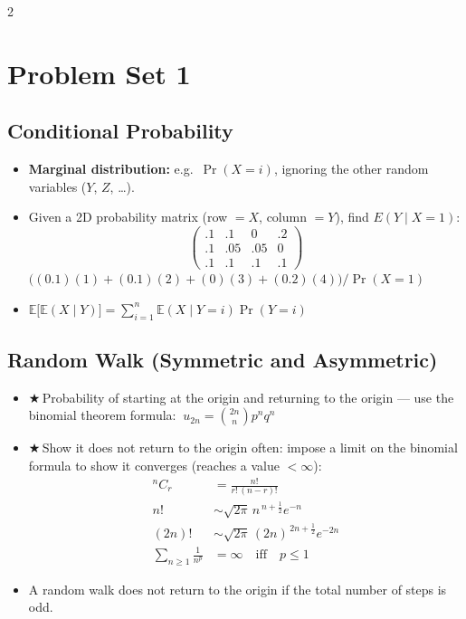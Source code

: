 \documentclass[8pt,letterpaper]{extarticle}
\newcommand{\cs}{{\color{red!75!black}$\bigstar$}\,} %
\begin{document}
\begin{multicols}{2}
\section{Problem Set 1}
\subsection{Conditional Probability}
\begin{itemize}
  \item \textbf{Marginal distribution:} e.g.\ $\Pr(X=i)$, ignoring the other random variables ($Y$, $Z$, \dots).
  \item Given a 2D probability matrix (row $=X$, column $=Y$), find $E(Y\mid X=1)$:
    \[ \begin{pmatrix} .1&.1&0&.2\\ .1&.05&.05&0\\ .1&.1&.1&.1 \end{pmatrix} \]
    $\big((0.1)(1)+(0.1)(2)+(0)(3)+(0.2)(4)\big)/\Pr(X=1)$
  \item $\mathbb{E}\big[\mathbb{E}(X\mid Y)\big]=\sum_{i=1}^{n}\mathbb{E}(X\mid Y=i)\Pr(Y=i)$
\end{itemize}

\subsection{Random Walk (Symmetric and Asymmetric)}
\begin{itemize}
  \item \cs Probability of starting at the origin and returning to the origin --- use the binomial theorem formula: $\ u_{2n}=\binom{2n}{n}p^nq^n$
  \item \cs Show it does not return to the origin often: impose a limit on the binomial formula to show it converges (reaches a value $<\infty$):
    \[ \begin{aligned}
      {}^{n}C_{r} &= \frac{n!}{r!\,(n-r)!} \\
      n! &\sim \sqrt{2\pi}\, n^{\,n+\frac12} e^{-n} \\
      (2n)! &\sim \sqrt{2\pi}\, (2n)^{\,2n+\frac12} e^{-2n} \\
      \sum_{n\ge1}\frac{1}{n^p} &= \infty \quad\text{iff}\quad p\le 1
    \end{aligned} \]
  \item A random walk does not return to the origin if the total number of steps is odd.
\end{itemize}


\end{multicols}
\end{document}
